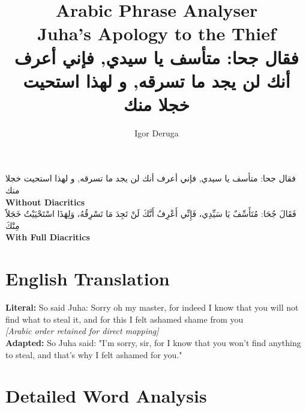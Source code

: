 \documentclass[a4paper,12pt]{article}
\begin{document}
\title{\textbf{\Large Arabic Phrase Analyser}\\
\large Juha's Apology to the Thief\\
\normalsize \textarabic{فقال جحا: متأسف يا سيدي, فإني أعرف أنك لن يجد ما تسرقه, و لهذا استحيت خجلا منك}}
\author{Igor Deruga}
\date{}
\maketitle

\begin{tcolorbox}[colback=boxcolor,colframe=headercolor,title=\textbf{Arabic Phrase}]
\centering
\textarabic{فقال جحا: متأسف يا سيدي, فإني أعرف أنك لن يجد ما تسرقه, و لهذا استحيت خجلا منك}
\\[0.5em]
\textbf{Without Diacritics}
\\[1em]
\textarabic{فَقَالَ جُحَا: مُتَأَسِّفٌ يَا سَيِّدِي، فَإِنِّي أَعْرِفُ أَنَّكَ لَنْ تَجِدَ مَا تَسْرِقُهُ، وَلِهَذَا اسْتَحْيَيْتُ خَجَلاً مِنْكَ}
\\[0.5em]
\textbf{With Full Diacritics}
\end{tcolorbox}

\section{English Translation}
\begin{tcolorbox}[colback=white,colframe=accentcolor]
\textbf{Literal:} So said Juha: Sorry oh my master, for indeed I know that you will not find what to steal it, and for this I felt ashamed shame from you \\
\textit{[Arabic order retained for direct mapping]}\\[0.5em]
\textbf{Adapted:} So Juha said: "I'm sorry, sir, for I know that you won't find anything to steal, and that's why I felt ashamed for you."
\end{tcolorbox}

\section{Detailed Word Analysis}
\end{document}

